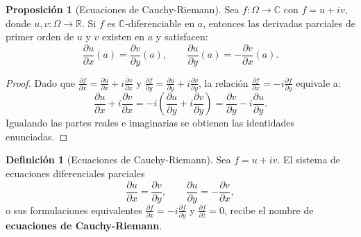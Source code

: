 \documentclass[11pt,a4paper]{article}
\theoremstyle{definition}
\newtheorem{definicion}{Definición}[section]
\newtheorem{proposicion}{Proposición}[section]
\theoremstyle{remark}
\numberwithin{equation}{section}
\begin{document}
\begin{proposicion}[Ecuaciones de Cauchy-Riemann]
Sea $f: \Omega \to \mathbb{C}$ con $f = u + iv$, donde $u, v: \Omega \to \mathbb{R}$. Si $f$ es $\mathbb{C}$-diferenciable en $a$, entonces las derivadas parciales de primer orden de $u$ y $v$ existen en $a$ y satisfacen:
\begin{equation}
\frac{\partial u}{\partial x}(a) = \frac{\partial v}{\partial y}(a), \qquad \frac{\partial u}{\partial y}(a) = -\frac{\partial v}{\partial x}(a).
\end{equation}
\end{proposicion}
\begin{proof}
Dado que $\frac{\partial f}{\partial x} = \frac{\partial u}{\partial x} + i\frac{\partial v}{\partial x}$ y $\frac{\partial f}{\partial y} = \frac{\partial u}{\partial y} + i\frac{\partial v}{\partial y}$, la relación $\frac{\partial f}{\partial x} = -i\frac{\partial f}{\partial y}$ equivale a:
\[
\frac{\partial u}{\partial x} + i\frac{\partial v}{\partial x} = -i\left( \frac{\partial u}{\partial y} + i\frac{\partial v}{\partial y} \right) = \frac{\partial v}{\partial y} - i\frac{\partial u}{\partial y}.
\]
Igualando las partes reales e imaginarias se obtienen las identidades enunciadas.
\end{proof}

\begin{definicion}[Ecuaciones de Cauchy-Riemann]
Sea $f = u+iv$. El sistema de ecuaciones diferenciales parciales
\begin{equation}
\frac{\partial u}{\partial x} = \frac{\partial v}{\partial y}, \qquad \frac{\partial u}{\partial y} = -\frac{\partial v}{\partial x},
\end{equation}
o sus formulaciones equivalentes $\frac{\partial f}{\partial x} = -i\frac{\partial f}{\partial y}$ y $\frac{\partial f}{\partial \bar{z}} = 0$, recibe el nombre de \textbf{ecuaciones de Cauchy-Riemann}.
\end{definicion}
\end{document}
